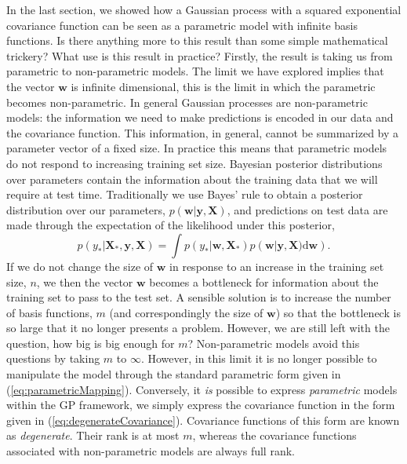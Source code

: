 In the last section, we showed how a Gaussian process with a squared
exponential covariance function can be seen as a parametric model with
infinite basis functions. Is there anything more to this result than
some simple mathematical trickery? What use is this result in
practice? Firstly, the result is taking us from parametric to
non-parametric models. The limit we have explored implies that the
vector $\mathbf{w}$ is infinite dimensional, this is the limit in
which the parametric becomes non-parametric. In general Gaussian
processes are non-parametric models: the information we need to make
predictions is encoded in our data and the covariance function. This
information, in general, cannot be summarized by a parameter vector of
a fixed size. In practice this means that parametric models do not
respond to increasing training set size. Bayesian posterior
distributions over parameters contain the information about the
training data that we will require at test time. Traditionally we use
Bayes' rule to obtain a posterior distribution over our parameters,
$p\left(\mathbf{w}|\mathbf{y}, \mathbf{X}\right)$, and predictions on
test data are made through the expectation of the likelihood under
this posterior,
\[
p\left(y_*|\mathbf{X}_*, \mathbf{y}, \mathbf{X}\right) = \int
p\left(y_*|\mathbf{w},\mathbf{X}_*\right)p\left(\mathbf{w}|\mathbf{y},
  \mathbf{X})\mathrm{d}\mathbf{w}\right).
\]
If we do not change the size of $\mathbf{w}$ in response to an
increase in the training set size, $n$, we then the vector
$\mathbf{w}$ becomes a bottleneck for information about the training
set to pass to the test set. A sensible solution is to increase the
number of basis functions, $m$ (and correspondingly the size of
$\mathbf{w}$) so that the bottleneck is so large that it no longer
presents a problem. However, we are still left with the question, how
big is big enough for $m$? Non-parametric models avoid this questions
by taking $m$ to $\infty$. However, in this limit it is no longer
possible to manipulate the model through the standard parametric form
given in (\ref{eq:parametricMapping}). Conversely, it
\emph{is} possible to express \emph{parametric} models within the GP
framework, we simply express the covariance function in the form given
in (\ref{eq:degenerateCovariance}). Covariance functions of this form
are known as \emph{degenerate}. Their rank is at most $m$, whereas the
covariance functions associated with non-parametric models are always
full rank.

